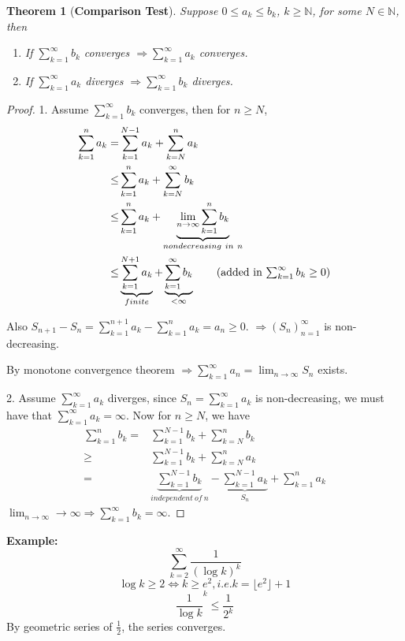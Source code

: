 \documentclass[12pt]{article}
\theoremstyle{plain}
\newtheorem{theorem}{Theorem}[subsection]
\newcommand{\mN}{{\mathbb{N}}}
\begin{document}
\begin{theorem}[\textbf{Comparison Test}]
	Suppose $0\leq a_k \leq b_k$, $k \geq \mN$, for some $N\in \mN$, 
	then 
	\begin{enumerate}
		\item If $\sum_{k=1}^{\infty} b_k$ converges $\Rightarrow 
			\sum_{k=1}^{\infty} a_k$ converges. 
		\item If $\sum_{k=1}^{\infty} a_k$ diverges $\Rightarrow 
			\sum_{k=1}^{\infty} b_k$ diverges.
	\end{enumerate}
\end{theorem}
\begin{proof}
	1. Assume $\sum_{k=1}^{\infty} b_k$ converges, then for $n\geq N$, 
	\begin{align*}
		\sum_{k=1}^n a_k 
		=& \sum_{k=1}^{N-1} a_k + \sum_{k=N}^n a_k		\\
		\leq& \sum_{k=1}^n a_k + \sum_{k=N}^{\infty} b_k	\\
		\leq& \sum_{k=1}^n a_k +\underbrace{\lim_{n\to\infty} \sum_{k=1}^n b_k}
		_{nondecreasing \ in\ n} \\
		\leq& \underbrace{\sum_{k=1}^{N+1} a_k}_{finite}
		+ \underbrace{\sum_{k=1}^{\infty} b_k }_{<\infty}
		\tag{added in $\sum_{k=1}^{\infty} b_k \geq 0$} 
	\end{align*}

	Also $S_{n+1} - S_n = \sum_{k=1}^{n+1} a_k - \sum_{k=1}^n a_k = a_n \geq 0$.
	$\Rightarrow (S_n)_{n=1}^{\infty}$ is non-decreasing. 

	By monotone convergence theorem $\Rightarrow \sum_{k=1}^{\infty} a_n =
	\lim_{n\to\infty} S_n$ exists. 

	2. Assume $\sum_{k=1}^{\infty}a_k$ diverges, since 
	$S_n = \sum_{k=1}^{\infty} a_k$ is non-decreasing, we must have that 
	$\sum_{k=1}^{\infty} a_k = \infty$. Now for $n\geq N$, we have
	\begin{align*}
		\sum_{k=1}^n b_k 
		=& \sum_{k=1}^{N-1}b_k + \sum_{k=N}^n b_k	\\
		\geq& \sum_{k=1}^{N-1} b_k + \sum_{k=N}^n a_k	\\
		=& \underbrace{\sum_{k=1}^{N-1} b_k}_{independent\ of\ n}
		- \underbrace{\sum_{k=1}^{N-1}a_k}_{S_n} + \sum_{k=1}^n a_k 
	\end{align*}
	$\lim_{n\to\infty} \to \infty \Rightarrow \sum_{k=1}^{\infty}b_k = \infty$.
\end{proof}

{\color{Brown}
	\textbf{Example: }
	\[
		\sum_{k=2}^{\infty} \frac 1{(\log k)^k} 
	\]
	\[
		\log k \geq 2 \Leftrightarrow k \geq e^2, i.e. k = \lfloor e^2 \rfloor+1
	\]
	\[
		\frac1{\log k}^k \leq \frac1{2^k}
	\]
	By geometric series of $\frac 12$, the series converges. 

}
\end{document}

